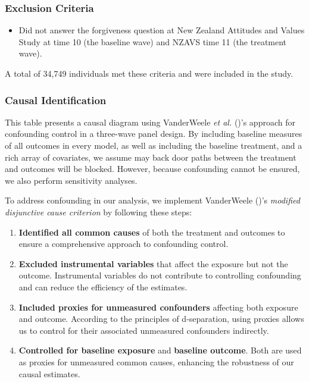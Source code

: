 \documentclass[
  single column]{article}
\providecommand{\tightlist}{%
  \setlength{\itemsep}{0pt}\setlength{\parskip}{0pt}}\usepackage{longtable,booktabs,array}
\begin{document}
\subsubsection{Exclusion Criteria}\label{exclusion-criteria}

\begin{itemize}
\tightlist
\item
  Did not answer the forgiveness question at New Zealand Attitudes and
  Values Study at time 10 (the baseline wave) and NZAVS time 11 (the
  treatment wave).
\end{itemize}

A total of 34,749 individuals met these criteria and were included in
the study.

\subsubsection{Causal Identification}\label{causal-identification}

\begin{table}

\caption{\label{tbl-02}This table presents a causal diagram using
VanderWeele \emph{et al.} ()'s
approach for confounding control in a three-wave panel design. By
including baseline measures of all outcomes in every model, as well as
including the baseline treatment, and a rich array of covariates, we
assume may back door paths between the treatment and outcomes will be
blocked. However, because confounding cannot be ensured, we also perform
sensitivity analyses.}

\centering{

\threevanderweeele

}

\end{table}%

To address confounding in our analysis, we implement VanderWeele
()'s \emph{modified disjunctive
cause criterion} by following these steps:

\begin{enumerate}
\def\labelenumi{\arabic{enumi}.}
\tightlist
\item
  \textbf{Identified all common causes} of both the treatment and
  outcomes to ensure a comprehensive approach to confounding control.
\item
  \textbf{Excluded instrumental variables} that affect the exposure but
  not the outcome. Instrumental variables do not contribute to
  controlling confounding and can reduce the efficiency of the
  estimates.
\item
  \textbf{Included proxies for unmeasured confounders} affecting both
  exposure and outcome. According to the principles of d-separation,
  using proxies allows us to control for their associated unmeasured
  confounders indirectly.
\item
  \textbf{Controlled for baseline exposure} and \textbf{baseline
  outcome}. Both are used as proxies for unmeasured common causes,
  enhancing the robustness of our causal estimates.
\end{enumerate}
\end{document}
